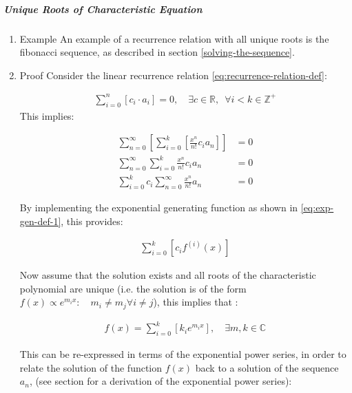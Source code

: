 \documentclass[11pt]{article}
\begin{document}
\subparagraph{Unique Roots of Characteristic Equation}
\label{uniq-roots-recurrence}
\begin{enumerate}
\item Example
\label{sec:org0a1bd78}
An example of a recurrence relation with all unique roots is the fibonacci sequence, as described in section \ref{solving-the-sequence}.
\item Proof
\label{sec:orge224dec}
Consider the linear recurrence relation \eqref{eq:recurrence-relation-def}:

\begin{align}
\sum^{n}_{i= 0}   \left[ c_i \cdot  a_i \right] = 0, \quad \exists c \in
\mathbb{R}, \enspace \forall i<k\in\mathbb{Z}^+ \nonumber \label{eq:recurrence-relation-def}
\end{align}
This implies:


\begin{align}
    \sum^{\infty}_{n= 0}   \left[ \sum^{k}_{i= 0}   \left[ \frac{x^n}{n!} c_i a_n \right]  \right]  &= 0 \\
    \sum^{\infty}_{n= 0}    \sum^{k}_{i= 0}    \frac{x^n}{n!} c_i a_n    &= 0 \\
        \sum^{k}_{i= 0} c_i \sum^{\infty}_{n= 0}    \frac{x^n}{n!}  a_n    &= 0
\end{align}

By implementing the exponential generating function as shown in
\eqref{eq:exp-gen-def-1}, this provides:

\begin{align}
   \sum^{k}_{i= 0}   \left[ c_i f^{\left( i \right)}\left( x \right) \right]
\end{align}


Now assume that the solution exists and all roots of the characteristic polynomial are unique (i.e. the solution is of the form \(f{\left({ x }\right)} \propto e^{m_i x}: \quad m_i \neq m_j \forall i\neq j\)), this implies that  \cite[Ch. 4]{zillDifferentialEquations2009a} :

\begin{align}
    f{\left({ x }\right)} = \sum^{k}_{i= 0}   {\left[{ k_i e^{m_i x} }\right]}, \quad \exists m,k \in \mathbb{C} \nonumber
\end{align}

This can be re-expressed in terms of the exponential power series, in order to relate the solution of the function \(f{\left({ x }\right)}\) back to a solution of the sequence \(a_n\), (see section for a derivation of the exponential power series):


\end{enumerate}
\end{document}
